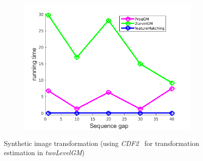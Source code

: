 \documentclass[
	fontsize=12pt,
	paper=a4,
	twoside=false,
	numbers=noenddot,
	plainheadsepline,
	toc=listof,
	toc=bibliography
]{scrartcl}
\begin{document}
\begin{figure}[h]
\begin{subfigure}[b]{0.3\textwidth}
		\includegraphics[scale=0.25]{"fig_ver2608/RealImages/ImgTrafo/no_descr/using_cpd_afftrafo/performance/time"}  
	\end{subfigure} 	
	\caption{Synthetic image transformation (using \emph{CDF2}~\cite{Myronenko2009_CPD} for transformation estimation in \emph{twoLevelGM})}
\end{figure}
\FloatBarrier
\end{document}
